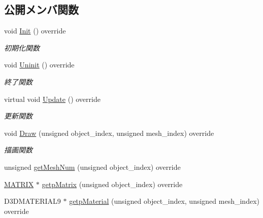 \subsection*{公開メンバ関数}
\begin{DoxyCompactItemize}
\item 
void \mbox{\hyperlink{class_goal_draw_a3eb0a555fa2db9d2c1253018ea65796e}{Init}} () override
\begin{DoxyCompactList}\small\item\em 初期化関数 \end{DoxyCompactList}\item 
void \mbox{\hyperlink{class_goal_draw_a01318a0606848a3ca8ca7b7acbf4df24}{Uninit}} () override
\begin{DoxyCompactList}\small\item\em 終了関数 \end{DoxyCompactList}\item 
virtual void \mbox{\hyperlink{class_goal_draw_a6e003277ed44eb9c800a616b6acbcb20}{Update}} () override
\begin{DoxyCompactList}\small\item\em 更新関数 \end{DoxyCompactList}\item 
void \mbox{\hyperlink{class_goal_draw_a554c826d7a4534ee489dfe18edf7ee0e}{Draw}} (unsigned object\+\_\+index, unsigned mesh\+\_\+index) override
\begin{DoxyCompactList}\small\item\em 描画関数 \end{DoxyCompactList}\item 
unsigned \mbox{\hyperlink{class_goal_draw_ac80c8da78cda7b15a4ce46f7d7057622}{get\+Mesh\+Num}} (unsigned object\+\_\+index) override
\item 
\mbox{\hyperlink{_vector3_d_8h_a032295cd9fb1b711757c90667278e744}{M\+A\+T\+R\+IX}} $\ast$ \mbox{\hyperlink{class_goal_draw_a536a23c043576f9032e6651d7644d038}{getp\+Matrix}} (unsigned object\+\_\+index) override
\item 
D3\+D\+M\+A\+T\+E\+R\+I\+A\+L9 $\ast$ \mbox{\hyperlink{class_goal_draw_ae7f45a84006809475aba8d9ce1b1f8a5}{getp\+Material}} (unsigned object\+\_\+index, unsigned mesh\+\_\+index) override
\end{DoxyCompactItemize}

